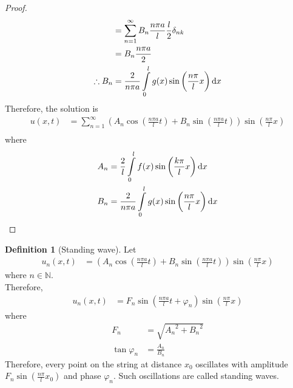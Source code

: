 \documentclass[titlepage, fleqn, a4paper, 12pt, twoside]{article}
\theoremstyle{definition}
\newtheorem{definition}{Definition}
\theoremstyle{theorem}
\begin{document}
\begin{proof}
\begin{align*}
                                                                                                & = \sum\limits_{n = 1}^{\infty} B_n \frac{n \pi a}{l} \frac{l}{2} \delta_{n k}                                                                             \\
                                                                                                & = B_n \frac{n \pi a}{2}                                                                                                                                   \\
		\therefore B_n                                                                  & = \frac{2}{n \pi a} \int\limits_{0}^{l} g(x) \sin\left( \frac{n \pi}{l} x \right) \dif x
	\end{align*}
	Therefore, the solution is
	\begin{align*}
		u(x,t) & = \sum\limits_{n = 1}^{\infty} \left( A_n \cos\left( \frac{n \pi a}{l} t \right) + B_n \sin\left( \frac{n \pi a}{l} t \right) \right) \sin\left( \frac{n \pi}{l} x \right) \\
	\end{align*}
	where
	\begin{align*}
		A_n & = \frac{2}{l} \int\limits_{0}^{l} f(x) \sin\left( \frac{k \pi}{l} x \right) \dif x \\
		B_n & = \frac{2}{n \pi a} \int\limits_{0}^{l} g(x) \sin\left( \frac{n \pi}{l} x \right) \dif x
	\end{align*}
\end{proof}

\begin{definition}[Standing wave]
Let
	\begin{align*}
		u_n(x,t) & = \left( A_n \cos\left( \frac{n \pi a}{l} t \right) + B_n \sin\left( \frac{n \pi a}{l} t \right) \right) \sin\left( \frac{n \pi}{l} x \right)
	\end{align*}
	where $n \in \mathbb{N}$.\\
	Therefore,
	\begin{align*}
		u_n(x,t) & = F_n \sin\left( \frac{n \pi a}{l} t + \varphi_n \right) \sin\left( \frac{n \pi}{l} x \right)
	\end{align*}
	where
	\begin{align*}
		F_n            & = \sqrt{{A_n}^2 + {B_n}^2} \\
		\tan \varphi_n & = \frac{A_n}{B_n}
	\end{align*}
	Therefore, every point on the string at distance $x_0$ oscillates with amplitude $F_n \sin\left( \frac{n \pi}{l} x_0 \right)$ and phase $\varphi_n$.
	Such oscillations are called standing waves.\\
\end{definition}
\end{document}
